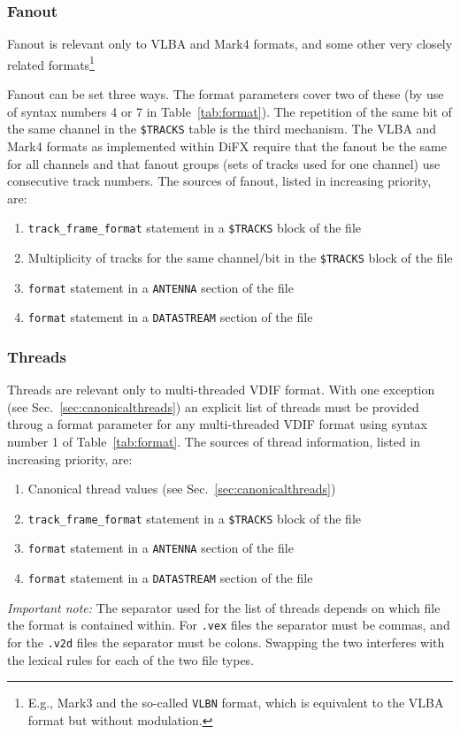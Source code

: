 \documentclass[12pt]{article}
\begin{document}
\subsubsection{Fanout}

Fanout is relevant only to VLBA and Mark4 formats, and some other very closely related formats\footnote{E.g., Mark3 and the so-called {\tt VLBN} format, which is equivalent to the VLBA format but without modulation.}

Fanout can be set three ways.
The format parameters cover two of these (by use of syntax numbers 4 or 7 in Table~\ref{tab:format}).
The repetition of the same bit of the same channel in the {\tt \$TRACKS} table is the third mechanism.
The VLBA and Mark4 formats as implemented within DiFX require that the fanout be the same for all channels and that fanout groups (sets of tracks used for one channel) use consecutive track numbers.
The sources of fanout, listed in increasing priority, are:
\begin{enumerate}
\item {\tt track\_frame\_format} statement in a {\tt \$TRACKS} block of the \vx file
\item Multiplicity of tracks for the same channel/bit in the {\tt \$TRACKS} block of the \vx file
\item {\tt format} statement in a {\tt ANTENNA} section of the \vd file
\item {\tt format} statement in a {\tt DATASTREAM} section of the \vd file
\end{enumerate}

\subsubsection{Threads}

Threads are relevant only to multi-threaded VDIF format.
With one exception (see Sec.~\ref{sec:canonicalthreads}) an explicit list of threads must be provided throug a format parameter for any multi-threaded VDIF format using syntax number 1 of Table~\ref{tab:format}.
The sources of thread information, listed in increasing priority, are:
\begin{enumerate}
\item Canonical thread values (see Sec.~\ref{sec:canonicalthreads})
\item {\tt track\_frame\_format} statement in a {\tt \$TRACKS} block of the \vx file
\item {\tt format} statement in a {\tt ANTENNA} section of the \vd file
\item {\tt format} statement in a {\tt DATASTREAM} section of the \vd file
\end{enumerate}
{\em Important note:} The separator used for the list of threads depends on which file the format is contained within.
For {\tt .vex} files the separator must be commas, and for the {\tt .v2d} files the separator must be colons.
Swapping the two interferes with the lexical rules for each of the two file types.
\end{document}
